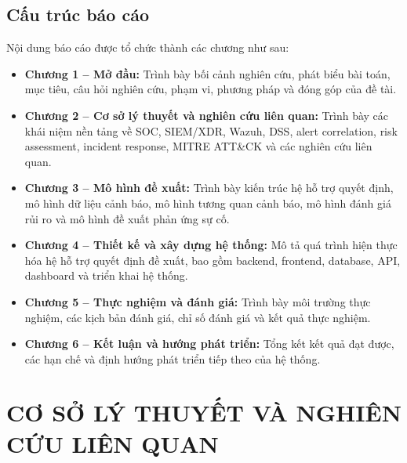 \documentclass[a4paper,12pt,oneside]{book}
\begin{document}
\section{Cấu trúc báo cáo}
{\fontsize{13pt}{15.6pt}\selectfont

Nội dung báo cáo được tổ chức thành các chương như sau:

\begin{itemize}
    \item \textbf{Chương 1 -- Mở đầu:} Trình bày bối cảnh nghiên cứu, phát biểu bài toán, mục tiêu, câu hỏi nghiên cứu, phạm vi, phương pháp và đóng góp của đề tài.
    \item \textbf{Chương 2 -- Cơ sở lý thuyết và nghiên cứu liên quan:} Trình bày các khái niệm nền tảng về SOC, SIEM/XDR, Wazuh, DSS, alert correlation, risk assessment, incident response, MITRE ATT\&CK và các nghiên cứu liên quan.
    \item \textbf{Chương 3 -- Mô hình đề xuất:} Trình bày kiến trúc hệ hỗ trợ quyết định, mô hình dữ liệu cảnh báo, mô hình tương quan cảnh báo, mô hình đánh giá rủi ro và mô hình đề xuất phản ứng sự cố.
    \item \textbf{Chương 4 -- Thiết kế và xây dựng hệ thống:} Mô tả quá trình hiện thực hóa hệ hỗ trợ quyết định đề xuất, bao gồm backend, frontend, database, API, dashboard và triển khai hệ thống.
    \item \textbf{Chương 5 -- Thực nghiệm và đánh giá:} Trình bày môi trường thực nghiệm, các kịch bản đánh giá, chỉ số đánh giá và kết quả thực nghiệm.
    \item \textbf{Chương 6 -- Kết luận và hướng phát triển:} Tổng kết kết quả đạt được, các hạn chế và định hướng phát triển tiếp theo của hệ thống.
\end{itemize}

}


\chapter{\MakeTextUppercase{Cơ sở lý thuyết và nghiên cứu liên quan}}
\end{document}
